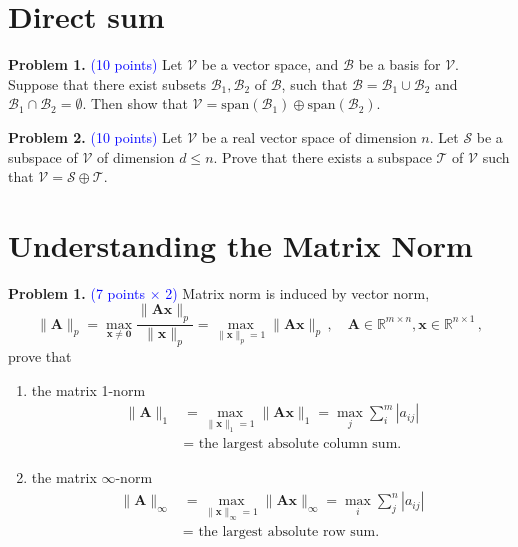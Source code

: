 \documentclass[english,onecolumn]{IEEEtran}
\begin{document}
\newpage
\section{Direct sum} 
\noindent\textbf{Problem 1.} \textcolor{blue}{(10 points)}
Let $\mathcal{V}$ be a vector space, and $\mathcal{B}$ be a basis for $\mathcal{V}$. Suppose that there exist subsets $\mathcal{B}_1, \mathcal{B}_2$ of $\mathcal{B}$, such that $\mathcal{B}=\mathcal{B}_1\cup \mathcal{B}_2$ and $\mathcal{B}_1\cap \mathcal{B}_2=\emptyset.$ Then show that $\mathcal{V}=\text{span}(\mathcal{B}_1)\oplus \text{span}(\mathcal{B}_2).$


\noindent\textbf{Problem 2.} \textcolor{blue}{(10 points)}
Let $\mathcal{V}$ be a real vector space of dimension $ n $. Let $\mathcal{S}$ be a subspace of $\mathcal{V}$ of dimension $ d \leq  n $.
Prove that there exists a subspace $\mathcal{T}$ of $\mathcal{V}$ such that $\mathcal{V}=\mathcal{S} \oplus \mathcal{T} $.



\newpage
\section{Understanding the Matrix Norm}
\noindent\textbf{Problem 1.} \textcolor{blue}{(7 points $\times$ 2)}
Matrix norm is induced by vector norm, 
\[
\|\mathbf{A}\|_p  = \max_{\mathbf{x}\ne \mathbf{0}} \frac{ \|\mathbf{Ax} \|_p}{\|\mathbf{x} \|_p} = \max_{\|\mathbf{x}\|_p= 1} \|\mathbf{Ax} \|_p\,, \quad \mathbf{A}\in \mathbb{R}^{m\times n},\mathbf{x}\in \mathbb{R}^{n\times 1}\,,
\]
prove that 
\begin{enumerate}
	\item the matrix 1-norm
	\begin{align*}
	\|\mathbf{A}\|_1  
	& =  \max_{\|\mathbf{x}\|_1= 1} \|\mathbf{Ax} \|_1 = \max_{j}\sum_{i}^m|a_{ij}|\\
	& = \text{ the largest absolute column sum.}
	\end{align*}
	\item the matrix $\infty$-norm
	\begin{align*}
	\|\mathbf{A}\|_{\infty} 
	& =  \max_{\|\mathbf{x}\|_{\infty}= 1} \|\mathbf{Ax} \|_{\infty} = \max_{i}\sum_{j}^n|a_{ij}|\\
	& = \text{ the largest absolute row sum.}
	\end{align*}
\end{enumerate} 




\newpage
\end{document}
